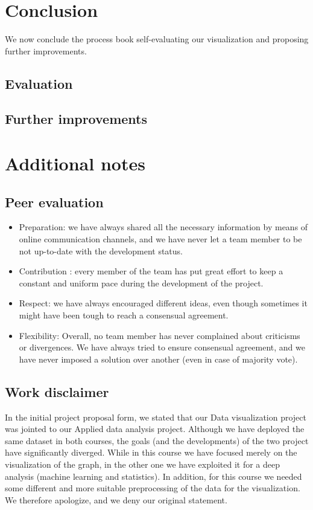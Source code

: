 \documentclass[a4paper,12pt]{article}
\begin{document}
\section{Conclusion}
We now conclude the process book self-evaluating our visualization and proposing further improvements.
\subsection{Evaluation}
\subsection{Further improvements}

\newpage

\setcounter{secnumdepth}{0} %
\section{Additional notes}
\subsection{Peer evaluation}
\begin{itemize}
	\item Preparation: we have always shared all the necessary information by means of online communication channels, and we have never let a team member to be not up-to-date with the development status.
	\item Contribution : every member of the team has put great effort to keep a constant and uniform pace during the development of the project.
	\item Respect: we have always encouraged different ideas, even though sometimes it might have been tough to reach a consensual agreement. 
	\item Flexibility: Overall, no team member has never complained about criticisms or divergences. We have always tried to ensure consensual agreement, and we have never imposed a solution over another (even in case of majority vote).
\end{itemize}

\subsection{Work disclaimer}
In the initial project proposal form, we stated that our Data visualization project was jointed to our Applied data analysis project. Although we have deployed the same dataset in both courses, the goals (and the developments) of the two project have significantly diverged. While in this course we have focused merely on the visualization of the graph, in the other one we have exploited it for a deep analysis (machine learning and statistics). In addition, for this course we needed some different and more suitable preprocessing of the data for the visualization. We therefore apologize, and we deny our original statement.
\end{document}
